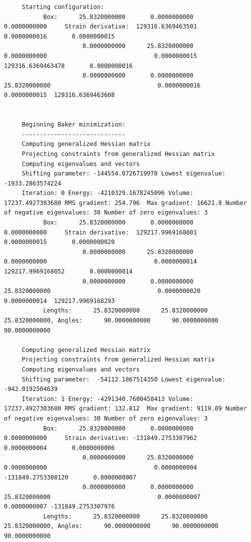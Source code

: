 \begin{tiny}
\begin{verbatim}
     Starting configuration:
           Box:      25.8320000000       0.0000000000       0.0000000000     Strain derivative:  129316.6369463501       0.0000000016       0.0000000015
                      0.0000000000      25.8320000000       0.0000000000                              0.0000000015  129316.6369463478       0.0000000016
                      0.0000000000       0.0000000000      25.8320000000                              0.0000000016       0.0000000015  129316.6369463608


     Beginning Baker minimization:
     -----------------------------
     Computing generalized Hessian matrix
     Projecting constraints from generalized Hessian matrix
     Computing eigenvalues and vectors
     Shifting parameter: -144554.0726719970 Lowest eigenvalue:   -1933.2863574224
     Iteration: 0 Energy: -4210329.1678245096 Volume:   17237.4927303680 RMS gradient: 254.796  Max gradient: 16621.8 Number of negative eigenvalues: 30 Number of zero eigenvalues: 3
           Box:      25.8320000000       0.0000000000       0.0000000000     Strain derivative:  129217.9969168001       0.0000000015       0.0000000020
                      0.0000000000      25.8320000000       0.0000000000                              0.0000000014  129217.9969168052       0.0000000014
                      0.0000000000       0.0000000000      25.8320000000                              0.0000000020       0.0000000014  129217.9969168293
           Lengths:      25.8320000000      25.8320000000      25.8320000000, Angles:      90.0000000000      90.0000000000      90.0000000000
     
     Computing generalized Hessian matrix
     Projecting constraints from generalized Hessian matrix
     Computing eigenvalues and vectors
     Shifting parameter:  -54112.1867514350 Lowest eigenvalue:    -942.0192504639
     Iteration: 1 Energy: -4291340.7600458413 Volume:   17237.4927303680 RMS gradient: 132.812  Max gradient: 9119.09 Number of negative eigenvalues: 30 Number of zero eigenvalues: 3
           Box:      25.8320000000       0.0000000000       0.0000000000     Strain derivative: -131849.2753307962       0.0000000004       0.0000000006
                      0.0000000000      25.8320000000       0.0000000000                              0.0000000004 -131849.2753308120       0.0000000007
                      0.0000000000       0.0000000000      25.8320000000                              0.0000000007       0.0000000007 -131849.2753307976
           Lengths:      25.8320000000      25.8320000000      25.8320000000, Angles:      90.0000000000      90.0000000000      90.0000000000
     

\end{verbatim}
\end{tiny}

